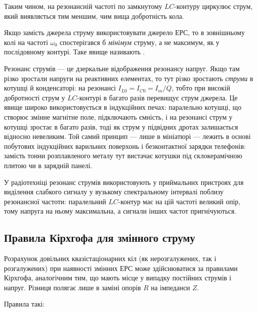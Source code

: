 Таким чином, на резонансній частоті по замкнутому $LC$-контуру циркулює струм, який виявляється тим меншим, чим вища добротність кола.

Якщо замість джерела струму використовувати джерело ЕРС, то в зовнішньому колі на частоті $\omega_0$ спостерігався б \emph{мінімум} струму, а не максимум, як у послідовному контурі. Таке явище називають .

\begin{Attention}
	Резонанс струмів --- це дзеркальне відображення резонансу напруг. Якщо там різко зростали напруги на реактивних елементах, то тут різко зростають \emph{струми} в котушці й конденсаторі: на резонансі $I_{L0} = I_{C0} = I_m/Q$, тобто при високій добротності струм у $LC$-контурі в багато разів перевищує струм джерела. Це явище широко використовується в індукційних печах: паралельно котушці, що створює змінне магнітне поле, підключають ємність, і на резонансі струм у котушці зростає в багато разів, тоді як струм у підвідних дротах залишається відносно невеликим. Той самий принцип --- лише в мініатюрі --- лежить в основі побутових індукційних варильних поверхонь і безконтактної зарядки телефонів: замість тонни розплавленого металу тут вистачає котушки під склокерамічною плитою чи в зарядній панелі.

	У радіотехніці резонанс струмів використовують у приймальних пристроях для виділення слабкого сигналу у вузькому спектральному інтервалі поблизу резонансної частоти: паралельний $LC$-контур має на цій частоті великий опір, тому напруга на ньому максимальна, а сигнали інших частот пригнічуються.
\end{Attention}


\subsection*{Правила Кірхгофа для змінного струму}

Розрахунок довільних квазістаціонарних кіл (як нерозгалужених, так і розгалужених) при наявності змінних ЕРС може здійснюватися за правилами Кірхгофа, аналогічним тим, що мають місце у
випадку постійних струмів і напруг. Різниця полягає лише в заміні
опорів $R$ на імпеданси $Z$.

Правила такі:

